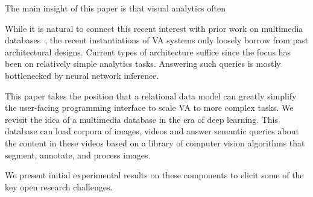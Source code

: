 








The main insight of this paper is that visual analytics often 










While it is natural to connect this recent interest with prior work on multimedia databases~\cite{yoshitaka1999survey}, the recent instantiations of VA systems only loosely borrow from past architectural designs. Current types of architecture suffice since the focus has been on relatively simple analytics tasks. 
Answering such queries is mostly bottlenecked by neural network inference.






This paper takes the position that a relational data model can greatly simplify the user-facing programming interface to scale VA to more complex tasks.
We revisit the idea of a multimedia database in the era of deep learning. 
This database can load corpora of images, videos and answer semantic queries about the content in these videos based on a library of computer vision algorithms that segment, annotate, and process images.







We present initial experimental results on these components to elicit some of the key open research challenges. 

